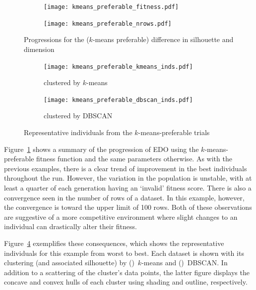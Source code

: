 \begin{figure}
    \centering
    \begin{subfigure}{\imgwidth}
        \texttt{[image: kmeans\_preferable\_fitness.pdf]}
    \end{subfigure}

    \begin{subfigure}{\imgwidth}
        \texttt{[image: kmeans\_preferable\_nrows.pdf]}
    \end{subfigure}
    \caption{%
        Progressions for the (\(k\)-means preferable) difference in silhouette
        and dimension
    }\label{fig:kmeans_preferable_progression}
\end{figure}

\begin{figure}
    \centering
    \begin{subfigure}{.95\textwidth}
        \texttt{[image: kmeans\_preferable\_kmeans\_inds.pdf]}
        \caption{%
            clustered by \(k\)-means
        }\label{fig:kmeans_preferable_kmeans_inds}
    \end{subfigure}

    \vspace{1em}
    \begin{subfigure}{.95\textwidth}
        \texttt{[image: kmeans\_preferable\_dbscan\_inds.pdf]}
        \caption{clustered by DBSCAN}\label{fig:kmeans_preferable_dbscan_inds}
    \end{subfigure}
    \caption{%
        Representative individuals from the \(k\)-means-preferable trials
    }\label{fig:kmeans_preferable_inds}
\end{figure}

Figure~\ref{fig:kmeans_preferable_progression} shows a summary of the
progression of EDO using the \(k\)-means-preferable fitness function and the
same parameters otherwise. As with the previous examples, there is a clear trend
of improvement in the best individuals throughout the run. However, the
variation in the population is unstable, with at least a quarter of each
generation having an `invalid' fitness score. There is also a convergence seen
in the number of rows of a dataset. In this example, however, the convergence is
toward the upper limit of 100 rows. Both of these observations are suggestive of
a more competitive environment where slight changes to an individual can
drastically alter their fitness.

Figure~\ref{fig:kmeans_preferable_inds} exemplifies these consequences, which
shows the representative individuals for this example from worst to best. Each
dataset is shown with its clustering (and associated silhouette) by
()~\(k\)-means and
()~DBSCAN. In addition to a scattering
of the cluster's data points, the latter figure displays the concave and convex
hulls of each cluster using shading and outline, respectively. 

